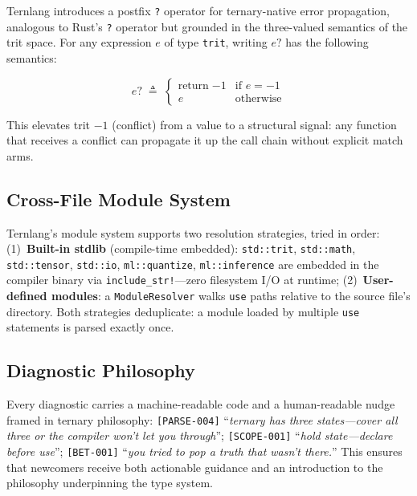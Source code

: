 \documentclass[journal,10pt,twocolumn]{IEEEtran}
\begin{document}
Ternlang introduces a postfix \texttt{?} operator for ternary-native error
propagation, analogous to Rust's \texttt{?} operator but grounded in the
three-valued semantics of the trit space. For any expression $e$ of type
\texttt{trit}, writing $e\texttt{?}$ has the following semantics:

\begin{equation}
  e\texttt{?} \;\triangleq\;
  \begin{cases}
    \text{return}\;{-1} & \text{if } e = {-1} \\
    e                   & \text{otherwise}
  \end{cases}
  \label{eq:propagate}
\end{equation}

This elevates trit $-1$ (conflict) from a value to a structural signal: any
function that receives a conflict can propagate it up the call chain without
explicit match arms.

\subsection{Cross-File Module System}
\label{subsec:modules}

Ternlang's module system supports two resolution strategies, tried in order:
(1)~\textbf{Built-in stdlib} (compile-time embedded): \texttt{std::trit},
\texttt{std::math}, \texttt{std::tensor}, \texttt{std::io},
\texttt{ml::quantize}, \texttt{ml::inference} are embedded in the compiler
binary via \texttt{include\_str!}---zero filesystem I/O at runtime;
(2)~\textbf{User-defined modules}: a \texttt{ModuleResolver} walks
\texttt{use} paths relative to the source file's directory. Both strategies
deduplicate: a module loaded by multiple \texttt{use} statements is parsed
exactly once.

\subsection{Diagnostic Philosophy}
\label{subsec:diagnostics}

Every diagnostic carries a machine-readable code and a human-readable nudge
framed in ternary philosophy: \texttt{[PARSE-004]} ``\emph{ternary has three
states---cover all three or the compiler won't let you through}'';
\texttt{[SCOPE-001]} ``\emph{hold state---declare before use}'';
\texttt{[BET-001]} ``\emph{you tried to pop a truth that wasn't there.}''
This ensures that newcomers receive both actionable guidance and an
introduction to the philosophy underpinning the type system.
\end{document}
